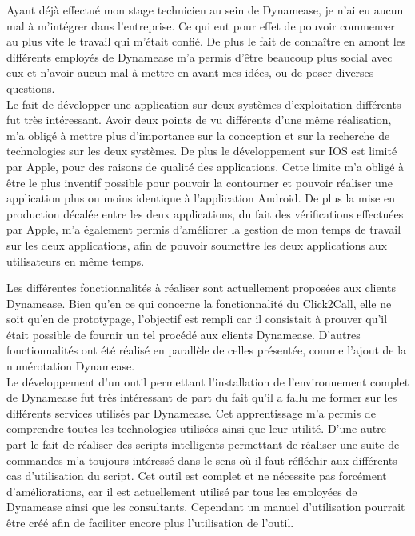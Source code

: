 Ayant déjà effectué mon stage technicien au sein de Dynamease, je n'ai eu aucun mal à m'intégrer dans l'entreprise. Ce qui eut pour effet de pouvoir commencer au plus vite le travail qui m'était confié. De plus le fait de connaître en amont les différents employés de Dynamease m'a permis d'être beaucoup plus social avec eux et n'avoir aucun mal à mettre en avant mes idées, ou de poser diverses questions.\\

Le fait de développer une application sur deux systèmes d'exploitation différents fut très intéressant. Avoir deux points de vu différents d'une même réalisation, m'a obligé à mettre plus d'importance sur la conception et sur la recherche de technologies sur les deux systèmes. De plus le développement sur IOS est limité par Apple, pour des raisons de qualité des applications. Cette limite m'a obligé à être le plus inventif possible pour pouvoir la contourner et pouvoir réaliser une application plus ou moins identique à l'application Android. De plus la mise en production décalée entre les deux applications, du fait des vérifications effectuées par Apple, m'a également permis d'améliorer la gestion de mon temps de travail sur les deux applications, afin de pouvoir soumettre les deux applications aux utilisateurs en même temps.

Les différentes fonctionnalités à réaliser sont actuellement proposées aux clients Dynamease. Bien qu'en ce qui concerne la fonctionnalité du Click2Call, elle ne soit qu'en de prototypage, l'objectif est rempli car il consistait à prouver qu'il était possible de fournir un tel procédé aux clients Dynamease. D'autres fonctionnalités ont été réalisé en parallèle de celles présentée, comme l'ajout de la numérotation Dynamease.\\

Le développement d'un outil permettant l'installation de l'environnement complet de Dynamease fut très intéressant de part du fait qu'il a fallu me former sur les différents services utilisés par Dynamease. Cet apprentissage m'a permis de comprendre toutes les technologies utilisées ainsi que leur utilité. D'une autre part le fait de réaliser des scripts intelligents permettant de réaliser une suite de commandes m'a toujours intéressé dans le sens où il faut réfléchir aux différents cas d'utilisation du script. Cet outil est complet et ne nécessite pas forcément d'améliorations, car il est actuellement utilisé par tous les employées de Dynamease ainsi que les consultants. Cependant un manuel d'utilisation pourrait être créé afin de faciliter encore plus l'utilisation de l'outil.\\

